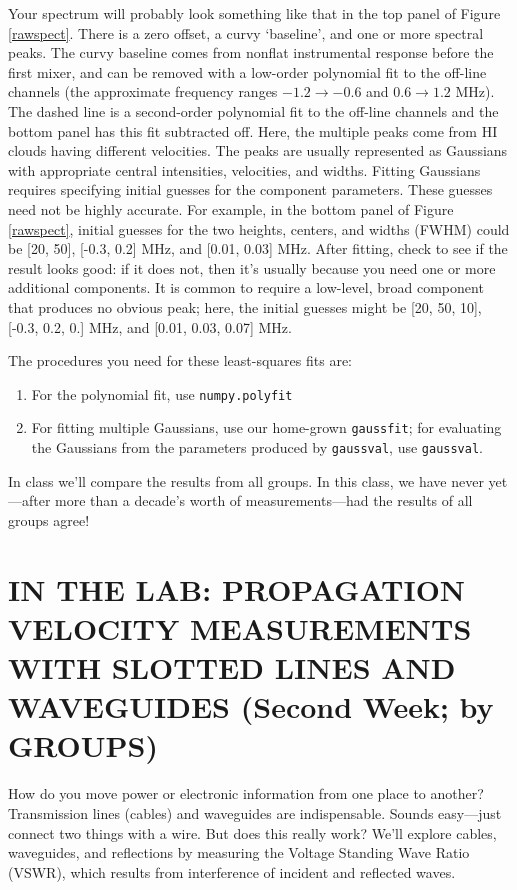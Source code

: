 \documentclass[12pt,preprint]{aastex}
\begin{document}
Your spectrum will probably look something like that in the top panel of
Figure \ref{rawspect}. There is a zero offset, a curvy `baseline', and
one or more spectral peaks. The curvy baseline comes from nonflat
instrumental response before the first mixer, and can be removed with a
low-order polynomial fit to the off-line channels (the approximate
frequency ranges $-1.2 \rightarrow -0.6$ and $ 0.6 \rightarrow 1.2$
MHz). The dashed line is a second-order polynomial fit to the off-line
channels and the bottom panel has this fit subtracted off.  Here, the
multiple peaks come from HI clouds having different velocities. The
peaks are usually represented as Gaussians with appropriate central
intensities, velocities, and widths.  Fitting Gaussians requires
specifying initial guesses for the component parameters. These guesses
need not be highly accurate. For example, in the bottom panel of Figure
\ref{rawspect}, initial guesses for the two heights, centers, and widths
(FWHM) could be [20, 50], [-0.3, 0.2] MHz, and [0.01, 0.03] MHz.  After
fitting, check to see if the result looks good: if it does not, then
it's usually because you need one or more additional components. It is
common to require a low-level, broad component that produces no obvious
peak; here, the initial guesses might be [20, 50, 10], [-0.3, 0.2, 0.]
MHz, and [0.01, 0.03, 0.07] MHz. 

The procedures you need for these least-squares fits
are: \begin{enumerate}
\item For the polynomial fit, use {\tt numpy.polyfit}

\item For fitting multiple Gaussians, use our home-grown {\tt gaussfit}; for
  evaluating the Gaussians from the parameters produced by {\tt gaussval}, 
  use {\tt gaussval}.
\end{enumerate}

In class we'll compare the results from all groups. In this class, we
have never yet---after more than a decade's worth of measurements---had
the results of all groups agree!

\section {IN THE LAB: PROPAGATION VELOCITY MEASUREMENTS WITH SLOTTED LINES AND 
WAVEGUIDES (Second Week; by GROUPS)} \label{expt}

How do you move power or electronic information from one place to
another? Transmission lines (cables) and waveguides are
indispensable. Sounds easy---just connect two things with a wire. But
does this really work? We'll explore cables, waveguides, and reflections
by measuring the Voltage Standing Wave Ratio (VSWR), which results from
interference of incident and reflected waves.
\end{document}
